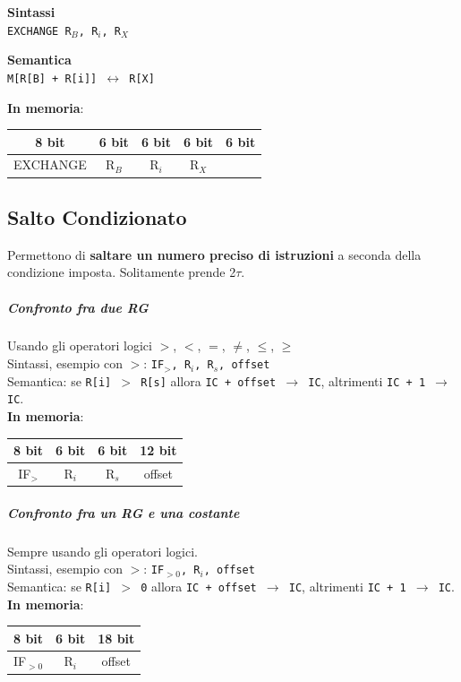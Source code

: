 \documentclass[10pt]{report}
\begin{document}
\begin{multicols}{2}
\begin{center}
\textbf{Sintassi}\\
\texttt{EXCHANGE R$_B$, R$_i$, R$_X$}
\end{center}
\columnbreak
\begin{center}
\textbf{Semantica}\\
\texttt{M[R[B] + R[i]] $\leftrightarrow$ R[X]}
\end{center}
\end{multicols}
\begin{center}
\textbf{In memoria}:  
\begin{tabular}{| c | c | c | c | c |}
\hline
8 bit & 6 bit & 6 bit & 6 bit & 6 bit\\
\hline
EXCHANGE & R$_B$ & R$_i$ & R$_X$  & \\
\hline
\end{tabular}
\end{center}
\subsection{Salto Condizionato}
Permettono di \textbf{saltare un numero preciso di istruzioni} a seconda della condizione imposta. Solitamente prende 2$\tau$.
\subparagraph{Confronto fra due RG} Usando gli operatori logici $>$, $<$, $=$, $\neq$, $\leq$, $\geq$\\
Sintassi, esempio con $>$: \texttt{IF$_>$, R$_i$, R$_s$, offset}\\
Semantica: se \texttt{R[i] $>$ R[s]} allora \texttt{IC + offset $\rightarrow$ IC}, altrimenti \texttt{IC + 1 $\rightarrow$ IC}.\\
\textbf{In memoria}:  
\begin{tabular}{| c | c | c | c |}
\hline
8 bit & 6 bit & 6 bit & 12 bit \\
\hline
IF$_>$ & R$_i$ & R$_s$ & offset \\
\hline
\end{tabular}
\subparagraph{Confronto fra un RG e una costante} Sempre usando gli operatori logici.\\
Sintassi, esempio con $>$: \texttt{IF$_{> 0}$, R$_i$, offset}\\
Semantica: se \texttt{R[i] $>$ 0} allora \texttt{IC + offset $\rightarrow$ IC}, altrimenti \texttt{IC + 1 $\rightarrow$ IC}.\\
\textbf{In memoria}:  
\begin{tabular}{| c | c | c |}
\hline
8 bit & 6 bit & 18 bit \\
\hline
IF$_{> 0}$ & R$_i$ & offset \\
\hline
\end{tabular}
\end{document}
